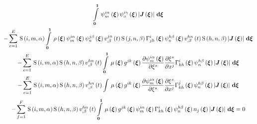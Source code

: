 \begin{multline}
{    \gint{\vectr{0}}{\vectr{1}}{\idxgbfn{i}{m}{\alpha}{\vectr{\xi}}\idxgbfn{i}{o}{\gamma}{\vectr{\xi}}
      \abs{\fnof{\matr{J}}{\vectr{\xi}}}}{\vectr{\xi}}}\\
  -\gsum{e=1}{E}{\idxgsf{i}{m}{\alpha}\gint{\vectr{0}}{\vectr{1}}{\fnof{\rho}{\vectr{\xi}}
      \idxgbfn{i}{m}{\alpha}{\vectr{\xi}}\idxgbfn{j}{n}{\beta}{\vectr{\xi}}
      \fnof{\idxnodedof{v}{j}{n}{\beta}}{t}\idxgsf{j}{n}{\beta}
      \fnof{\christoffel{i}{j}{h}}{\vectr{\xi}}
      \idxgbfn{h}{n}{\beta}{\vectr{\xi}}\fnof{\idxnodedof{v}{h}{n}{\beta}}{t}\idxgsf{h}{n}{\beta}
      \abs{\fnof{\matr{J}}{\vectr{\xi}}}}{\vectr{\xi}}}\\
  -\gsum{e=1}{E}{\idxgsf{i}{m}{\alpha}\idxgsf{h}{n}{\beta}\fnof{\idxnodedof{v}{h}{n}{\beta}}{t}
    \gint{\vectr{0}}{\vectr{1}}{\fnof{\mu}{\vectr{\xi}}\fnof{g^{jk}}{\vectr{\xi}}
      \delby{\idxgbfn{i}{m}{\alpha}{\vectr{\xi}}}{\xi^{s}}\delby{\xi^{s}}{x^{j}}
      \fnof{\christoffel{i}{k}{h}}{\vectr{\xi}}\idxgbfn{h}{n}{\beta}{\vectr{\xi}}    
    \abs{\fnof{\matr{J}}{\vectr{\xi}}}}{\vectr{\xi}}}\\
  -\gsum{e=1}{E}{\idxgsf{i}{m}{\alpha}\idxgsf{h}{n}{\beta}\fnof{\idxnodedof{v}{h}{n}{\beta}}{t}
    \gint{}{}{\fnof{\mu}{\vectr{\xi}}\fnof{g^{ik}}{\vectr{\xi}}
      \delby{\idxgbfn{i}{m}{\alpha}{\vectr{\xi}}}{\xi^{s}}\delby{\xi^{s}}{x^{j}}
      \fnof{\christoffel{j}{k}{h}}{\vectr{\xi}}\idxgbfn{h}{n}{\beta}{\vectr{\xi}}        
    \abs{\fnof{\matr{J}}{\vectr{\xi}}}}{\vectr{\xi}}}\\
  -\gsum{f=1}{F}{\idxgsf{i}{m}{\alpha}\idxgsf{h}{n}{\beta}\fnof{\idxnodedof{v}{h}{n}{\beta}}{t}
    \gint{\vectr{0}}{\vectr{1}}{\fnof{\mu}{\vectr{\xi}}\fnof{g^{jk}}{\vectr{\xi}}\idxgbfn{i}{m}{\alpha}{\vectr{\xi}}
      \fnof{\christoffel{i}{k}{h}}{\vectr{\xi}}\idxgbfn{h}{n}{\beta}{\vectr{\xi}}\fnof{n_{j}}{\vectr{\xi}}
      \abs{\fnof{\matr{J}}{\vectr{\xi}}}}{\vectr{\xi}}}=0
  \label{eqn:NSEFEM4}
\end{multline}

